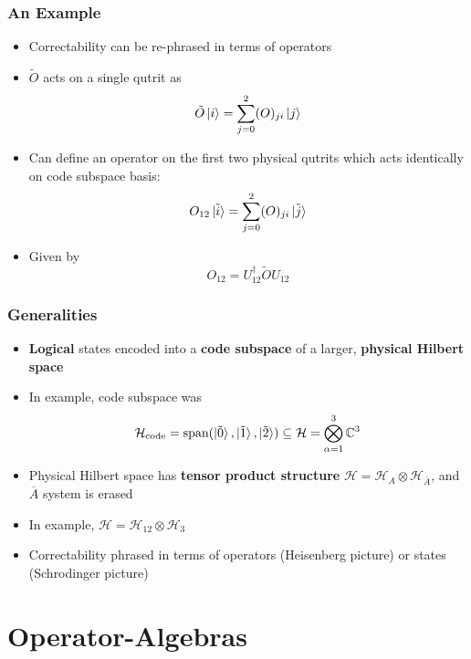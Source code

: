\documentclass[11pt]{beamer}
\begin{document}
	\begin{frame}
		\frametitle{An Example}
		\begin{itemize}[<+->]
			\item Correctability can be re-phrased in terms of operators
			\item $\tilde{O}$ acts on a single qutrit as
			\begin{equation}
				\tilde{O}\ket{i}=\sum_{j=0}^{2}(O)_{ji}\ket{j}
			\end{equation}
			\item Can define an operator on the first two physical qutrits which acts identically on code subspace basis:
			\begin{equation}
				O_{12}\ket{\tilde{i}}=\sum_{j=0}^{2}(O)_{ji}\ket{\tilde{j}}
			\end{equation}
			\item Given by
			\begin{equation}
				O_{12}=U_{12}^{\dagger}\tilde{O}U_{12}
			\end{equation}
		\end{itemize}
	\end{frame}

	\begin{frame}
		\frametitle{Generalities}
		\begin{itemize}[<+->]
			\item \textbf{Logical} states encoded into a \textbf{code subspace} of a larger, \textbf{physical Hilbert space}
			\item In example, code subspace was
			\begin{equation}
				\mathcal{H}_{\text{code}}=\text{span}(\ket{\tilde{0}},\ket{\tilde{1}},\ket{\tilde{2}})\subseteq \mathcal{H}=\bigotimes_{\alpha=1}^{3}\mathbb{C}^{3}
			\end{equation}
			\item Physical Hilbert space has \textbf{tensor product structure} $\mathcal{H}=\mathcal{H}_{A}\otimes\mathcal{H}_{\overline{A}}$, and $\overline{A}$ system is erased
			\item In example, $\mathcal{H}=\mathcal{H}_{12}\otimes\mathcal{H}_{3}$
			\item Correctability phrased in terms of operators (Heisenberg picture) or states (Schrodinger picture)
		\end{itemize}
	\end{frame}

	\section{Operator-Algebras}
	
\end{document}
